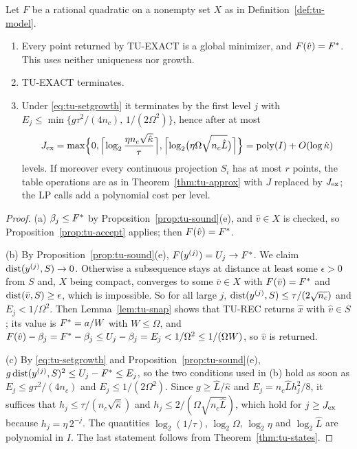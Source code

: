 \begin{theorem}\label{thm:tu-exact}
Let $F$ be a rational quadratic on a nonempty set $X$ as in
Definition~\ref{def:tu-model}.
\begin{enumerate}[label=(\alph*)]
\item Every point returned by TU-EXACT is a global minimizer, and
$F(\hat v)=F^*$. This uses neither uniqueness nor growth.
\item TU-EXACT terminates.
\item Under \eqref{eq:tu-setgrowth} it terminates by the first level $j$ with
$E_j\le\min\{g\tau^2/(4n_c),\,1/(2\Omega^2)\}$, hence after at most
\[
J_{\rm ex}=\max\Bigl\{0,\Bigl\lceil\log_2\frac{\eta n_c\sqrt{\hat\kappa}}{\tau}\Bigr\rceil,
\Bigl\lceil\log_2\bigl(\eta\Omega\sqrt{n_c\hat L}\bigr)\Bigr\rceil\Bigr\}
=\operatorname{poly}(I)+O(\log\hat\kappa)
\]
levels. If moreover every continuous projection $S_i$ has at most $r$ points,
the table operations are as in Theorem~\ref{thm:tu-approx} with $J$ replaced
by $J_{\rm ex}$; the LP calls add a polynomial cost per level.
\end{enumerate}
\end{theorem}

\begin{proof}
(a) $\beta_j\le F^*$ by Proposition~\ref{prop:tu-sound}(e), and $\hat v\in X$ is
checked, so Proposition~\ref{prop:tu-accept} applies; then $F(\hat v)=F^*$.

(b) By Proposition~\ref{prop:tu-sound}(e), $F(y^{(j)})=U_j\to F^*$. We claim
$\operatorname{dist}(y^{(j)},S)\to0$. Otherwise a subsequence stays at distance at least
some $\epsilon>0$ from $S$ and, $X$ being compact, converges to some
$\bar v\in X$ with $F(\bar v)=F^*$ and $\operatorname{dist}(\bar v,S)\ge\epsilon$, which is
impossible. So for all large $j$, $\operatorname{dist}(y^{(j)},S)\le\tau/(2\sqrt{n_c})$ and
$E_j<1/\Omega^2$. Then Lemma~\ref{lem:tu-snap} shows that TU-REC returns
$\hat x$ with $\hat v\in S$; its value is $F^*=a/W$ with $W\le\Omega$, and
$F(\hat v)-\beta_j=F^*-\beta_j\le U_j-\beta_j=E_j<1/\Omega^2\le1/(\Omega W)$, so
$\hat v$ is returned.

(c) By \eqref{eq:tu-setgrowth} and Proposition~\ref{prop:tu-sound}(e),
$g\operatorname{dist}(y^{(j)},S)^2\le U_j-F^*\le E_j$, so the two conditions used in (b)
hold as soon as $E_j\le g\tau^2/(4n_c)$ and $E_j\le1/(2\Omega^2)$. Since
$g\ge\hat L/\hat\kappa$ and $E_j=n_c\hat Lh_j^2/8$, it suffices that
$h_j\le\tau/(n_c\sqrt{\hat\kappa})$ and $h_j\le2/(\Omega\sqrt{n_c\hat L})$, which hold
for $j\ge J_{\rm ex}$ because $h_j=\eta\,2^{-j}$. The quantities $\log_2(1/\tau)$, $\log_2\Omega$,
$\log_2\eta$ and $\log_2\hat L$ are polynomial in $I$. The last statement
follows from Theorem~\ref{thm:tu-states}.
\end{proof}

